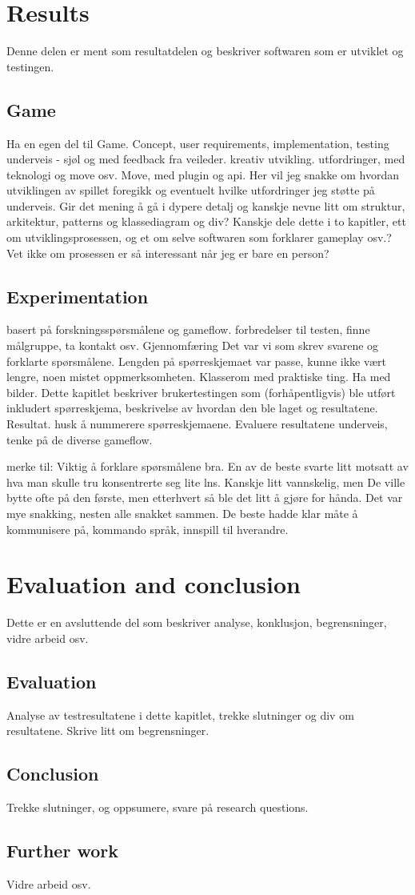 \documentclass[11pt, a4paper]{report}
\begin{document}
	
	\chapter{Results}
	Denne delen er ment som resultatdelen og beskriver softwaren som er utviklet og testingen.
	
	\section{Game}
	Ha en egen del til Game. Concept, user requirements, implementation, testing underveis - sjøl og med feedback fra veileder. kreativ utvikling. utfordringer, med teknologi og move osv. Move, med plugin og api.
	Her vil jeg snakke om hvordan utviklingen av spillet foregikk og eventuelt hvilke utfordringer jeg støtte på underveis. Gir det mening å gå i dypere detalj og kanskje nevne litt om struktur, arkitektur, patterns og klassediagram og div? Kanskje dele dette i to kapitler, ett om utviklingsprosessen, og et om selve softwaren som forklarer gameplay osv.? Vet ikke om prosessen er så interessant når jeg er bare en person?
	
	\section{Experimentation}
	basert på forskningsspørsmålene og gameflow.
	forbredelser til testen, finne målgruppe, ta kontakt osv.
	Gjennomfæring
	Det var vi som skrev svarene og forklarte spørsmålene.
	Lengden på spørreskjemaet var passe, kunne ikke vært lengre, noen mistet oppmerksomheten.
	Klasserom med praktiske ting.
	Ha med bilder.
	Dette kapitlet beskriver brukertestingen som (forhåpentligvis) ble utført inkludert spørreskjema, beskrivelse av hvordan den ble laget og resultatene.
	Resultat.
	husk å nummerere spørreskjemaene.
	Evaluere resultatene underveis, tenke på de diverse gameflow.
	
	merke til:
	Viktig å forklare spørsmålene bra.
	En av de beste svarte litt motsatt av hva man skulle tru konsentrerte seg lite lns.
	Kanskje litt vannskelig, men 
	De ville bytte ofte på den første, men etterhvert så ble det litt å gjøre for hånda.
	Det var mye snakking, nesten alle snakket sammen.
	De beste hadde klar måte å kommunisere på, kommando språk, innspill til hverandre.
	
	
	
	\chapter{Evaluation and conclusion}
	Dette er en avsluttende del som beskriver analyse, konklusjon, begrensninger, vidre arbeid osv.
	
	\section{Evaluation}
	Analyse av testresultatene i dette kapitlet, trekke slutninger og div om resultatene. 	Skrive litt om begrensninger.
	
	\section{Conclusion}
	Trekke slutninger, og oppsumere, svare på research questions.
	
	\section{Further work}
	Vidre arbeid osv.
\end{document}

